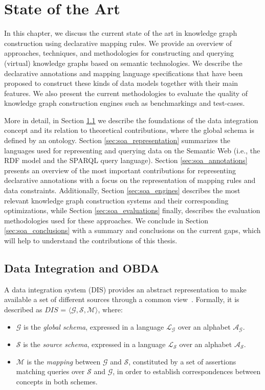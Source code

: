 \chapter{State of the Art}
\label{chap:soa}

In this chapter, we discuss the current state of the art in knowledge graph construction using declarative mapping rules. We provide an overview of approaches, techniques, and methodologies for constructing and querying (virtual) knowledge graphs based on semantic technologies. We describe the declarative annotations and mapping language specifications that have been proposed to construct these kinds of data models together with their main features. We also present the current methodologies to evaluate the quality of knowledge graph construction engines such as benchmarkings and test-cases. 

More in detail, in Section \ref{sec:soa_integration} we describe the foundations of the data integration concept and its relation to theoretical contributions, where the global schema is defined by an ontology. Section \ref{sec:soa_representation} summarizes the languages used for representing and querying data on the Semantic Web (i.e., the RDF model and the SPARQL query language). Section \ref{sec:soa_annotations} presents an overview of the most important contributions for representing declarative annotations with a focus on the representation of mapping rules and data constraints. Additionally, Section \ref{sec:soa_engines} describes the most relevant knowledge graph construction systems and their corresponding optimizations, while Section \ref{sec:soa_evaluations} finally, describes the evaluation methodologies used for these approaches. We conclude in Section \ref{sec:soa_conclusions} with a summary and conclusions on the current gaps, which will help to understand the contributions of this thesis.


\section{Data Integration and OBDA}
\label{sec:soa_integration}
A data integration system (DIS) provides an abstract representation to make available a set of different sources through a common view~\citep{Lenzerini02}. Formally, it is described as $DIS$ = $\langle \mathcal{G}, \mathcal{S}, \mathcal{M} \rangle$, where:
\begin{itemize}
    \item $\mathcal{G}$ is the \textit{global schema}, expressed in a language $\mathcal{L_G}$ over an alphabet $\mathcal{A_G}$.
    
    \item $\mathcal{S}$ is the \textit{source schema}, expressed in a language $\mathcal{L_S}$ over an alphabet $\mathcal{A_S}$.
    
    \item $\mathcal{M}$ is the \textit{mapping} between $\mathcal{G}$ and $\mathcal{S}$, constituted by a set of assertions matching queries over $\mathcal{S}$ and $\mathcal{G}$, in order to establish correspondences between concepts in both schemes.
\end{itemize}

